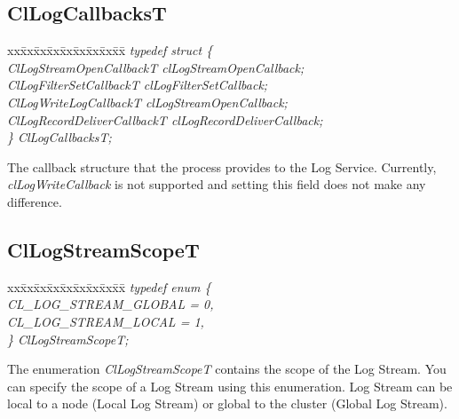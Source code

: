 \begin{flushleft}
\subsection{ClLogCallbacksT}
\begin{tabbing}
xx\=xx\=xx\=xx\=xx\=xx\=xx\=xx\=xx\=\kill
\textit{typedef struct \{}\\
\>\>\>\>\textit{ClLogStreamOpenCallbackT    clLogStreamOpenCallback;}\\
\>\>\>\>\textit{ClLogFilterSetCallbackT          clLogFilterSetCallback;}\\
\>\>\>\>\textit{ClLogWriteLogCallbackT         clLogStreamOpenCallback;}\\
\>\>\>\>\textit{ClLogRecordDeliverCallbackT	clLogRecordDeliverCallback;}\\
\textit{\} ClLogCallbacksT;}\end{tabbing}

The callback structure that the process provides to the Log Service. Currently, 
\textit{clLogWriteCallback} is not supported and setting this field does not 
make any difference.


\subsection{ClLogStreamScopeT}
\begin{tabbing}
xx\=xx\=xx\=xx\=xx\=xx\=xx\=xx\=xx\=\kill
\textit{typedef enum \{}\\
\>\>\>\>\textit{CL\_LOG\_STREAM\_GLOBAL = 0,}\\
\>\>\>\>\textit{CL\_LOG\_STREAM\_LOCAL = 1,}\\
\textit{\} ClLogStreamScopeT;}\end{tabbing}
The enumeration \textit{ClLogStreamScopeT} contains the scope of the Log Stream. You can specify the scope of a Log Stream using this enumeration.
Log Stream can be local to a node (Local Log Stream) or global to the cluster (Global Log Stream).



\end{flushleft}
